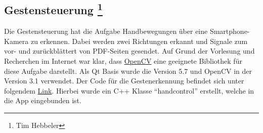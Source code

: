 \subsection[Gestensteuerung]{Gestensteuerung \footnote{Tim Hebbeler}}
\thispagestyle{fancy}

Die Gestensteuerung hat die Aufgabe Handbewegungen über eine Smartphone-Kamera zu erkennen. Dabei werden zwei Richtungen erkannt und Signale zum vor- und zurückblättert von PDF-Seiten gesendet. Auf Grund der Vorlesung und Recherchen im Internet war klar, dass \href{http://opencv.org/}{OpenCV} eine geeignete  Bibliothek für diese Aufgabe darstellt. Als Qt Basis wurde die Version 5.7 und OpenCV in der Version 3.1 verwendet. Der Code für die Gestenerkennung befindet sich unter folgendem \href{https://github.com/BeckmaR/EmbeddedMultimediaSS2016/tree/master/src/handcontrol}{Link}. Hierbei wurde ein C++ Klasse "`handcontrol"' erstellt, welche in die App eingebunden ist.

